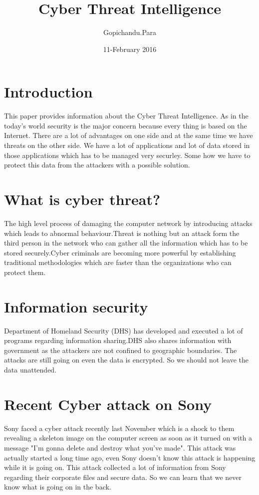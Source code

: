 \documentclass{article}
\title{Cyber Threat Intelligence}
\author{Gopichandu.Para }
\date{11-February 2016}
\begin{document}
\maketitle

\section{Introduction}
This paper provides information about the Cyber Threat Intelligence. As in the today's world security is the major concern because every thing is based on the Internet. There are a lot of advantages on one side and at the same time we have threats on the other side. We have a lot of applications and lot of data stored in those applications which has to be managed very securley. Some how we have to protect this data from the attackers with a possible solution.

\section{What is cyber threat?}
The high level process of damaging the computer network by introducing attacks which leads to abnormal behaviour.Threat is nothing but an attack form the third person in the network who can gather all the information which has to be stored securely.Cyber criminals are becoming more powerful by establishing traditional methodologies which are faster than the organizations who can protect them.

\section{Information security}
Department of Homeland Security (DHS) has developed and executed a lot of programs regarding information sharing.DHS also shares information with government as the attackers are not confined to geographic boundaries. The attacks are still going on even the data is encrypted. So we should not leave the data unattended.

\section{Recent Cyber attack on Sony}
Sony faced a cyber attack recently last November which is a shock to them revealing a skeleton image on the computer screen as soon as it turned on with a message "I'm gonna delete and destroy what you've made". This attack was actually started a long time ago, even Sony doesn't know this attack is happening while it is going on. This attack collected a lot of information from Sony regarding their corporate files and secure data.
So we can learn that we never know what is going on in the back.
\end{document}
